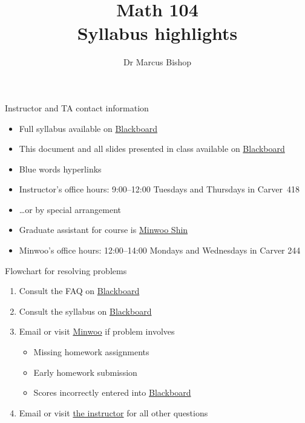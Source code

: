 \documentclass[xcolor=dvipsnames]{beamer}
\title[Syllabus highlights]{Math 104\\Syllabus highlights}
\author{Dr Marcus Bishop}
\theoremstyle{definition}
\begin{document}
\begin{frame}\titlepage\end{frame}
\LogoOff

\begin{frame}{Instructor and TA contact information}
\begin{itemize}
\item Full syllabus available on
\href{https://bb.its.iastate.edu}{\color{blue} Blackboard}
\item This document and all slides presented in class
available on
\href{https://bb.its.iastate.edu}{\color{blue} Blackboard}
\item Blue words hyperlinks
\item Instructor's office hours:
9:00--12:00 Tuesdays and Thursdays in Carver~418
\item \dots or by special arrangement
\item Graduate assistant for course is
\href{mailto:mws@iastate.edu}{\color{blue} Minwoo Shin}
\item Minwoo's office hours:
12:00--14:00 Mondays and Wednesdays in Carver 244
\end{itemize}
\end{frame}

\begin{frame}{Flowchart for resolving problems}
\begin{enumerate}
\item Consult the FAQ on
\href{https://bb.its.iastate.edu}{\color{blue} Blackboard}
\item Consult the syllabus on
\href{https://bb.its.iastate.edu}{\color{blue} Blackboard}
\item Email or visit \href{mailto:mws@iastate.edu}{\color{blue}Minwoo}
if problem involves
\begin{itemize}
\item Missing homework assignments
\item Early homework submission
\item Scores incorrectly entered into
\href{https://bb.its.iastate.edu}{\color{blue} Blackboard}
\end{itemize}
\item Email or visit \href{mailto:mbishop@iastate.edu}{\color{blue}the instructor}
for all other questions
\end{enumerate}
\end{frame}
\end{document}
